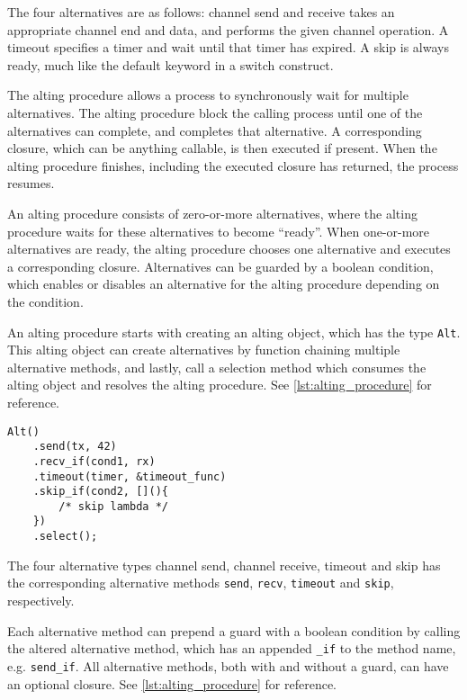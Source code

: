 The four alternatives are as follows: channel send and receive takes an appropriate channel end and data, and performs the given channel operation. A timeout specifies a timer and wait until that timer has expired. A skip is always ready, much like the default keyword in a switch construct. 

The alting procedure allows a process to synchronously wait for multiple alternatives. The alting procedure block the calling process until one of the alternatives can complete, and completes that alternative. A corresponding closure, which can be anything callable, is then executed if present. When the alting procedure finishes, including the executed closure has returned, the process resumes.

An alting procedure consists of zero\hyp{}or\hyp{}more alternatives, where the alting procedure waits for these alternatives to become ``ready''. When one\hyp{}or\hyp{}more alternatives are ready, the alting procedure chooses one alternative and executes a corresponding closure. Alternatives can be guarded by a boolean condition, which enables or disables an alternative for the alting procedure depending on the condition.

An alting procedure starts with creating an alting object, which has the type \lstinline[style={CustomC++}]|Alt|. This alting object can create alternatives by function chaining multiple alternative methods, and lastly, call a selection method which consumes the alting object and resolves the alting procedure. See \cref{lst:alting_procedure} for reference.

\begin{lstfloat}
\begin{lstlisting}[caption={Example of the alting construct.}, label={lst:alting_procedure}, style={CustomC++}, xleftmargin={2em}]
Alt()
    .send(tx, 42)
    .recv_if(cond1, rx)
    .timeout(timer, &timeout_func)
    .skip_if(cond2, [](){
        /* skip lambda */
    })
    .select();
\end{lstlisting}
\end{lstfloat}

The four alternative types channel send, channel receive, timeout and skip has the corresponding alternative methods \lstinline[style={CustomC++}]|send|, \lstinline[style={CustomC++}]|recv|, \lstinline[style={CustomC++}]|timeout| and \lstinline[style={CustomC++}]|skip|, respectively. 

Each alternative method can prepend a guard with a boolean condition by calling the altered alternative method, which has an appended \lstinline[style={CustomC++}]|_if| to the method name, e.g. \lstinline[style={CustomC++}]|send_if|. All alternative methods, both with and without a guard, can have an optional closure. See \cref{lst:alting_procedure} for reference.

